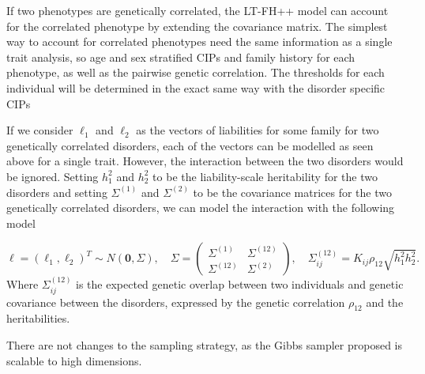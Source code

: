 If two phenotypes are genetically correlated, the LT-FH++ model can account for the correlated phenotype by extending the covariance matrix. The simplest way to account for correlated phenotypes need the same information as a single trait analysis, so age and sex stratified CIPs and family history for each phenotype, as well as the pairwise genetic correlation. The thresholds for each individual will be determined in the exact same way with the disorder specific CIPs


If we consider $ \ell_1 $ and $ \ell_2 $ as the vectors of liabilities for some family for two genetically correlated disorders, each of the vectors can be modelled as seen above for a single trait. However, the interaction between the two disorders would be ignored. Setting $ h_1^2 $ and $ h_2^2 $ to be the liability-scale heritability for the two disorders and setting  $ \Sigma^{(1)} $ and $ \Sigma^{(2)} $ to be the covariance matrices for the two genetically correlated disorders, we can model the interaction with the following model

\begin{equation*}
	\ell = \left(\ell_1, \ell_2\right)^T \sim N(\mathbf{0}, \Sigma), \quad \Sigma = 
	\begin{pmatrix} 
		\Sigma^{(1)} & \Sigma^{(12)} \\
		\Sigma^{(12)} & \Sigma^{(2)} 
	\end{pmatrix}, \quad \Sigma^{(12)}_{ij} = K_{ij}\rho_{12}\sqrt{h_1^2 h_2^2}.
\end{equation*}
Where $ \Sigma_{ij}^{(12)} $ is the expected genetic overlap between two individuals and genetic covariance between the disorders, expressed by the genetic correlation $ \rho_{12} $ and the heritabilities.

There are not changes to the sampling strategy, as the Gibbs sampler proposed is scalable to high dimensions.



